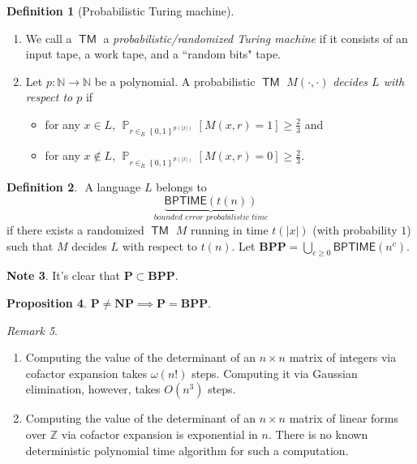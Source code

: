 \documentclass[10pt,letterpaper,cm]{nupset}
\theoremstyle{definition}
\newtheorem{definition}{Definition}[subsection]
\newtheorem{note}[definition]{Note}
\theoremstyle{theorem}
\newtheorem{prop}[definition]{Proposition}
\theoremstyle{remark}
\newtheorem{remark}[definition]{Remark}
\newcommand{\N}{\mathbb N}
\newcommand{\Z}{\mathbb Z}
\newcommand{\1}{\mathbf{1}}
\newcommand{\0}{\vec 0}
\DeclareMathOperator{\pr}{\mathbb{P}}
\DeclareMathOperator{\TM}{\mathsf{TM}}
\begin{document}
\begin{definition}[Probabilistic Turing machine] $ $
\begin{enumerate}
\item We call a $\TM$ a \textit{probabilistic/randomized Turing machine} if it consists of an input tape, a work tape, and a ``random bits" tape.  
\item Let $p: \N \to \N$ be a polynomial. A probabilistic $\TM$ $M({\cdot}, {\cdot})$ \textit{decides $L$ with respect to $p$} if 
\begin{itemize}
\item for any $x\in L$, $\pr_{r\in_R \left\{0,1\right\}^{p(\left\lvert{x}\right\rvert)}}\left[M(x,r)=1\right] \geq \frac{2}{3}$ and
\item for any $x\notin L$, $\pr_{r\in_R \left\{0,1\right\}^{p(\left\lvert{x}\right\rvert)}}\left[M(x,r)=0\right] \geq \frac{2}{3}$.
\end{itemize}
\end{enumerate}
\end{definition}

\begin{definition} $ $
A language $L$ belongs to $$\underbrace{\mathsf{BPTIME}(t(n))}_{\textit{bounded error probabilistic time}}$$ if there exists a randomized $\TM$ $M$ running in time $t(\left\lvert{x}\right\rvert)$ (with probability $1$) such that $M$ decides $L$ with respect to $t(n)$. Let $\mathbf{BPP}= \bigcup_{c\geq 0} \mathsf{BPTIME}(n^c)$.
\end{definition}

\begin{note}
It's clear that $\mathbf{P} \subset \mathbf{BPP}$.
\end{note}

\begin{prop}
$\mathbf{P} \ne \mathbf{NP} \implies \mathbf{P} = \mathbf{BPP}$.
\end{prop}

\bigskip

\begin{remark} $ $
\begin{enumerate}
\item Computing the value of the determinant of an $n\times n$ matrix of integers via cofactor expansion takes $\omega(n!)$ steps. Computing it via Gaussian elimination, however, takes $O\left(n^3\right)$ steps. 
\item Computing the value of the determinant of an $n\times n$ matrix of linear forms over $\Z$ via cofactor expansion is exponential in $n$. There is no known deterministic polynomial time algorithm for such a computation.
\end{enumerate}
\end{remark}
\end{document}
